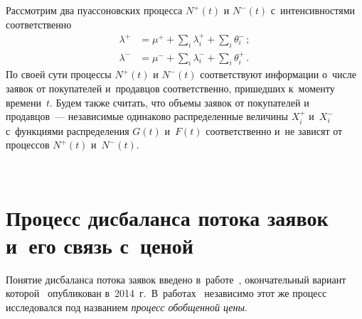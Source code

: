 \begin{multicols}{2}
Рассмотрим два пуассоновских процесса $N^+(t)$ и $N^-(t)$
с~интенсивностями соответственно
\begin{align*}
\lambda^+ &= \mu^{+} + \sum\limits_{i} \lambda_i^{+} + \sum\limits_{i} \theta_i^{-}\,;
\\
\lambda^- &= \mu^{-} + \sum\limits_i \lambda_i^{-} + \sum\limits_i \theta_i^{+}\,.
\end{align*}
По своей сути процессы $N^+(t)$ и $N^-(t)$ соответствуют информации
о~числе заявок от покупателей и~продавцов соответственно, пришедших
к~моменту времени~$t$. Будем также считать, что объемы заявок от
покупателей и продавцов~--- независимые одинаково распределенные
величины $X_i^+$ и~$X_i^-$ с~функциями распределения $G(t)$ и~$F(t)$
соответственно и~не зависят от процессов $N^+(t)$ и~$N^-(t)$.

\begin{figure*}[b] %
\vspace*{1pt}
 \begin{center}
 \mbox{%
 \epsfxsize=141.02mm
 }
 \end{center}
 \vspace*{-9pt}
\end{figure*}

\section{Процесс дисбаланса потока заявок и~его связь с~ценой}

Понятие дисбаланса потока заявок введено в~работе~\cite{Cont2011},
окончательный вариант которой~\cite{Cont2014} опуб\-ли\-ко\-ван в~2014~г.\
В~работах~\cite{Korolev_2013, Chertok2014} независимо этот же
процесс исследовался под названием {\it процесс обобщенной цены}.


\end{multicols}
